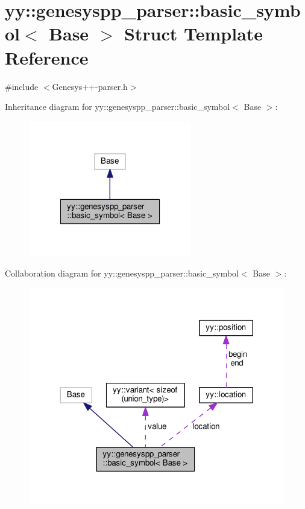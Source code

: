 \hypertarget{structyy_1_1genesyspp__parser_1_1basic__symbol}{\section{yy\-:\-:genesyspp\-\_\-parser\-:\-:basic\-\_\-symbol$<$ Base $>$ Struct Template Reference}
\label{structyy_1_1genesyspp__parser_1_1basic__symbol}
}


{\ttfamily \#include $<$Genesys++-\/parser.\-h$>$}



Inheritance diagram for yy\-:\-:genesyspp\-\_\-parser\-:\-:basic\-\_\-symbol$<$ Base $>$\-:
\nopagebreak
\begin{figure}[H]
\begin{center}
\leavevmode
\includegraphics[width=202pt]{structyy_1_1genesyspp__parser_1_1basic__symbol__inherit__graph}
\end{center}
\end{figure}


Collaboration diagram for yy\-:\-:genesyspp\-\_\-parser\-:\-:basic\-\_\-symbol$<$ Base $>$\-:
\nopagebreak
\begin{figure}[H]
\begin{center}
\leavevmode
\includegraphics[width=320pt]{structyy_1_1genesyspp__parser_1_1basic__symbol__coll__graph}
\end{center}
\end{figure}
